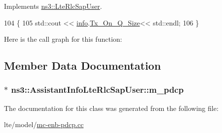 Implements \hyperlink{classns3_1_1LteRlcSapUser_a08d268f7a773c87325bffcf8e01031a5}{ns3\+::\+Lte\+Rlc\+Sap\+User}.


\begin{DoxyCode}
104                                                                                      \{
105 std::cout << \hyperlink{classns3_1_1LteRlcSapUser_ae5c93c1d5c538c4f8cec3ad4ecbd898a}{info}.\hyperlink{structns3_1_1EpcX2Sap_1_1AssistantInformationForSplitting_ac76b7b3f85738aeb1d2152a743176428}{Tx\_On\_Q\_Size}<< std::endl;
106 \}
\end{DoxyCode}


Here is the call graph for this function\+:




\subsection{Member Data Documentation}
\subsubsection[{\texorpdfstring{m\+\_\+pdcp}{m_pdcp}}]{$\ast$ ns3\+::\+Assistant\+Info\+Lte\+Rlc\+Sap\+User\+::m\+\_\+pdcp\hspace{0.3cm}{\ttfamily [private]}}\hypertarget{classns3_1_1AssistantInfoLteRlcSapUser_a3771160807799e11f7451c924fcd53a2}{}\label{classns3_1_1AssistantInfoLteRlcSapUser_a3771160807799e11f7451c924fcd53a2}


The documentation for this class was generated from the following file\+:\begin{DoxyCompactItemize}
\item 
lte/model/\hyperlink{mc-enb-pdcp_8cc}{mc-\/enb-\/pdcp.\+cc}\end{DoxyCompactItemize}
